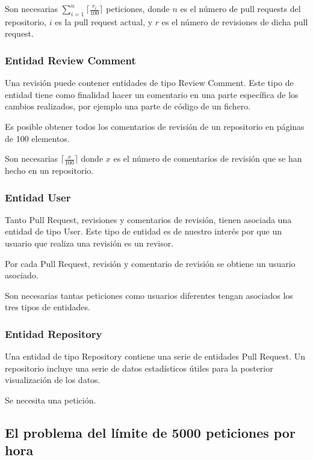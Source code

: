 Son necesarias $\sum_{i=1}^{n}\lceil\frac{r_{i}}{100}\rceil$ peticiones, donde $n$ es el número de pull requests del repositorio, $i$ es la pull request actual, y $r$ es el número de revisiones de dicha pull request.

\subsubsection{Entidad Review Comment}

Una revisión puede contener entidades de tipo Review Comment. Este tipo de entidad tiene como finalidad hacer un comentario en una parte específica de los cambios realizados, por ejemplo una parte de código de un fichero.

Es posible obtener todos los comentarios de revisión de un repositorio en páginas de 100 elementos.


Son necesarias $\lceil\frac{x}{100}\rceil$ donde $x$ es el número de comentarios de revisión que se han hecho en un repositorio.

\subsubsection{Entidad User}

Tanto Pull Request, revisiones y comentarios de revisión, tienen asociada una entidad de tipo User. Este tipo de entidad es de nuestro interés por que un usuario que realiza una revisión es un revisor.

Por cada Pull Request, revisión y comentario de revisión se obtiene un usuario asociado.

Son necesarias tantas peticiones como usuarios diferentes tengan asociados los tres tipos de entidades.

\subsubsection{Entidad Repository}

Una entidad de tipo Repository contiene una serie de entidades Pull Request. Un repositorio incluye una serie de datos estadísticos útiles para la posterior visualización de los datos.

Se necesita una petición.

\subsection{El problema del límite de 5000 peticiones por hora}

